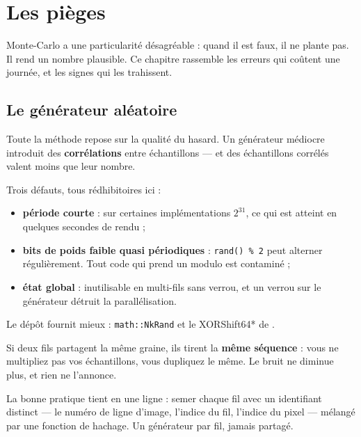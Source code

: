 \chapter{Les pièges}

Monte-Carlo a une particularité désagréable : quand il est faux, il ne plante
pas. Il rend un nombre plausible. Ce chapitre rassemble les erreurs qui coûtent
une journée, et les signes qui les trahissent.

\section{Le générateur aléatoire}

Toute la méthode repose sur la qualité du hasard. Un générateur médiocre
introduit des \textbf{corrélations} entre échantillons — et des échantillons
corrélés valent moins que leur nombre.

\begin{nkpiege}
Trois défauts, tous rédhibitoires ici :
\begin{itemize}
  \item \textbf{période courte} : sur certaines implémentations $2^{31}$, ce
        qui est atteint en quelques secondes de rendu ;
  \item \textbf{bits de poids faible quasi périodiques} : \texttt{rand() \% 2}
        peut alterner régulièrement. Tout code qui prend un modulo est
        contaminé ;
  \item \textbf{état global} : inutilisable en multi-fils sans verrou, et un
        verrou sur le générateur détruit la parallélisation.
\end{itemize}
Le dépôt fournit mieux : \texttt{math::NkRand} et le XORShift64* de
.
\end{nkpiege}

\begin{nkpiege}
Si deux fils partagent la même graine, ils tirent la \textbf{même séquence} :
vous ne multipliez pas vos échantillons, vous dupliquez le même. Le bruit ne
diminue plus, et rien ne l'annonce.

La bonne pratique tient en une ligne : semer chaque fil avec un identifiant
distinct — le numéro de ligne d'image, l'indice du fil, l'indice du pixel —
mélangé par une fonction de hachage. Un générateur par fil, jamais partagé.
\end{nkpiege}

